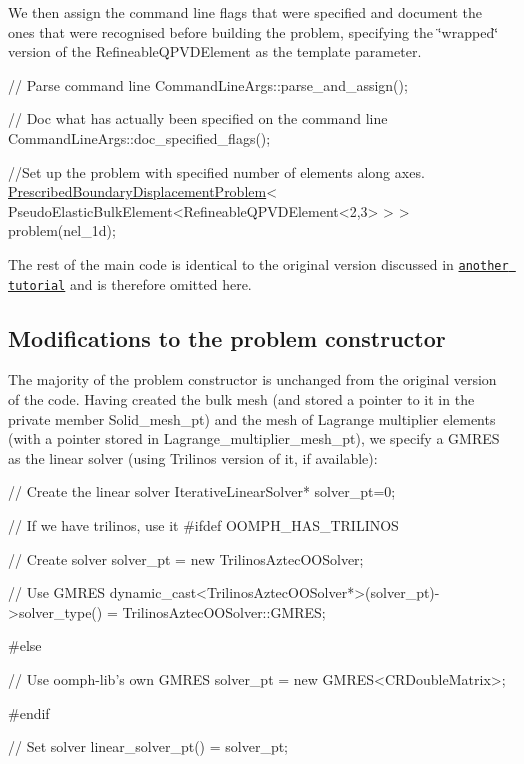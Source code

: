 We then assign the command line flags that were specified and document the ones that were recognised before building the problem, specifying the \char`\"{}wrapped\char`\"{} version of the {\ttfamily Refineable\+Q\+P\+V\+D\+Element} as the template parameter.


\begin{DoxyCodeInclude}
 \textcolor{comment}{// Parse command line}
 CommandLineArgs::parse\_and\_assign(); 
 
 \textcolor{comment}{// Doc what has actually been specified on the command line}
 CommandLineArgs::doc\_specified\_flags();

 \textcolor{comment}{//Set up the problem with specified number of elements along axes.}
 \hyperlink{classPrescribedBoundaryDisplacementProblem}{PrescribedBoundaryDisplacementProblem}<
  PseudoElasticBulkElement<RefineableQPVDElement<2,3> > > problem(nel\_1d);

\end{DoxyCodeInclude}


The rest of the main code is identical to the original version discussed in \href{../../../solid/prescribed_displ_lagr_mult/html/index.html}{\tt another tutorial} and is therefore omitted here.



\hypertarget{index_constr}{}\subsection{Modifications to the problem constructor}\label{index_constr}
The majority of the problem constructor is unchanged from the original version of the code. Having created the bulk mesh (and stored a pointer to it in the private member {\ttfamily Solid\+\_\+mesh\+\_\+pt}) and the mesh of Lagrange multiplier elements (with a pointer stored in {\ttfamily Lagrange\+\_\+multiplier\+\_\+mesh\+\_\+pt}), we specify a G\+M\+R\+ES as the linear solver (using Trilinos\textquotesingle{} version of it, if available)\+:

 
\begin{DoxyCodeInclude}
 \textcolor{comment}{// Create the linear solver}
 IterativeLinearSolver* solver\_pt=0;

 \textcolor{comment}{// If we have trilinos, use it}
\textcolor{preprocessor}{#ifdef OOMPH\_HAS\_TRILINOS}

 \textcolor{comment}{// Create solver}
 solver\_pt = \textcolor{keyword}{new} TrilinosAztecOOSolver;

 \textcolor{comment}{// Use GMRES}
 \textcolor{keyword}{dynamic\_cast<}TrilinosAztecOOSolver*\textcolor{keyword}{>}(solver\_pt)->solver\_type() 
  = TrilinosAztecOOSolver::GMRES;
 
\textcolor{preprocessor}{#else}

 \textcolor{comment}{// Use oomph-lib's own GMRES}
 solver\_pt = \textcolor{keyword}{new} GMRES<CRDoubleMatrix>;

\textcolor{preprocessor}{#endif}

 \textcolor{comment}{// Set solver}
 linear\_solver\_pt() = solver\_pt;

\end{DoxyCodeInclude}


